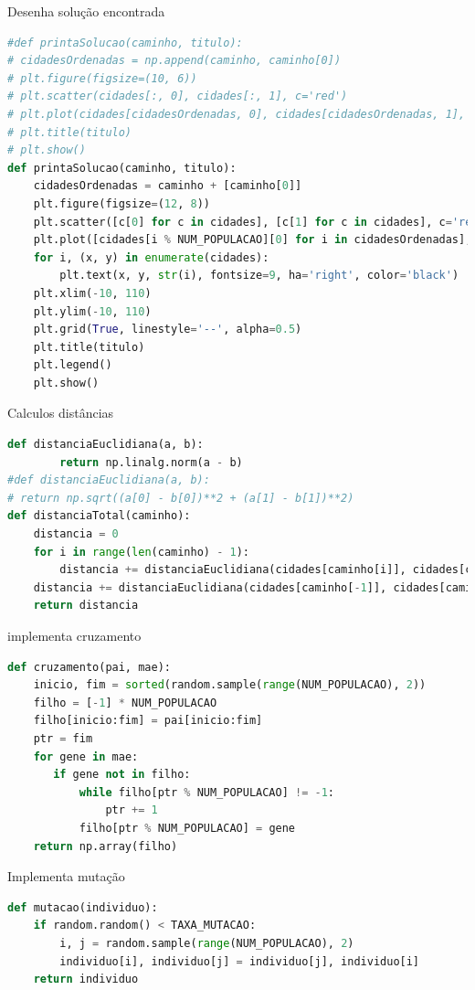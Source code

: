 Desenha solução encontrada

\begin{lstlisting}[language=Python, style=input]
#def printaSolucao(caminho, titulo):
# cidadesOrdenadas = np.append(caminho, caminho[0])
# plt.figure(figsize=(10, 6))
# plt.scatter(cidades[:, 0], cidades[:, 1], c='red')
# plt.plot(cidades[cidadesOrdenadas, 0], cidades[cidadesOrdenadas, 1], 'b-')
# plt.title(titulo)
# plt.show()
def printaSolucao(caminho, titulo): 
    cidadesOrdenadas = caminho + [caminho[0]] 
    plt.figure(figsize=(12, 8)) 
    plt.scatter([c[0] for c in cidades], [c[1] for c in cidades], c='red', s=50, label="Cidades") 
    plt.plot([cidades[i % NUM_POPULACAO][0] for i in cidadesOrdenadas], [cidades[i % NUM_POPULACAO][1] for i in cidadesOrdenadas], 'b-', alpha=0.6, linewidth=1.5) 
    for i, (x, y) in enumerate(cidades): 
        plt.text(x, y, str(i), fontsize=9, ha='right', color='black') 
    plt.xlim(-10, 110) 
    plt.ylim(-10, 110) 
    plt.grid(True, linestyle='--', alpha=0.5) 
    plt.title(titulo) 
    plt.legend() 
    plt.show()
\end{lstlisting}

Calculos distâncias
\begin{lstlisting}[language=Python, style=input]
    def distanciaEuclidiana(a, b): 
        return np.linalg.norm(a - b)
#def distanciaEuclidiana(a, b):
# return np.sqrt((a[0] - b[0])**2 + (a[1] - b[1])**2)
def distanciaTotal(caminho): 
    distancia = 0 
    for i in range(len(caminho) - 1): 
        distancia += distanciaEuclidiana(cidades[caminho[i]], cidades[caminho[i+1]]) 
    distancia += distanciaEuclidiana(cidades[caminho[-1]], cidades[caminho[0]]) 
    return distancia
\end{lstlisting}

implementa cruzamento
\begin{lstlisting}[language=Python, style=input]
def cruzamento(pai, mae): 
    inicio, fim = sorted(random.sample(range(NUM_POPULACAO), 2)) 
    filho = [-1] * NUM_POPULACAO 
    filho[inicio:fim] = pai[inicio:fim] 
    ptr = fim 
    for gene in mae:
       if gene not in filho: 
           while filho[ptr % NUM_POPULACAO] != -1: 
               ptr += 1 
           filho[ptr % NUM_POPULACAO] = gene 
    return np.array(filho)
\end{lstlisting}

Implementa mutação

\begin{lstlisting}[language=Python, style=input]
def mutacao(individuo): 
    if random.random() < TAXA_MUTACAO: 
        i, j = random.sample(range(NUM_POPULACAO), 2) 
        individuo[i], individuo[j] = individuo[j], individuo[i] 
    return individuo
\end{lstlisting}

